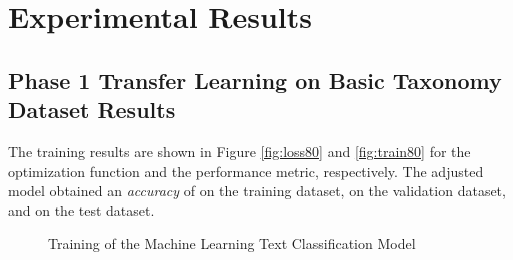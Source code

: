 \documentclass[onecolumn, journal, english, 12pt, a4paper]{IEEEtran} %
\theoremstyle{definition}
\begin{document}
\section{Experimental Results}\label{chap:resultados}

\subsection{Phase 1 Transfer Learning on Basic Taxonomy Dataset Results}
\label{sec:phase-1-dataset-results-tl}

The training results are shown in Figure \ref{fig:loss80} and
\ref{fig:train80} for the optimization function and the performance
metric, respectively. The adjusted model obtained an \emph{accuracy}
of  on the training dataset,  on the
validation dataset, and  on the test dataset.

\begin{figure}[!t]
  \centering
  \hfil
  \caption{Training of the Machine Learning Text Classification Model}
  \label{fig: results}
\end{figure}
\end{document}
